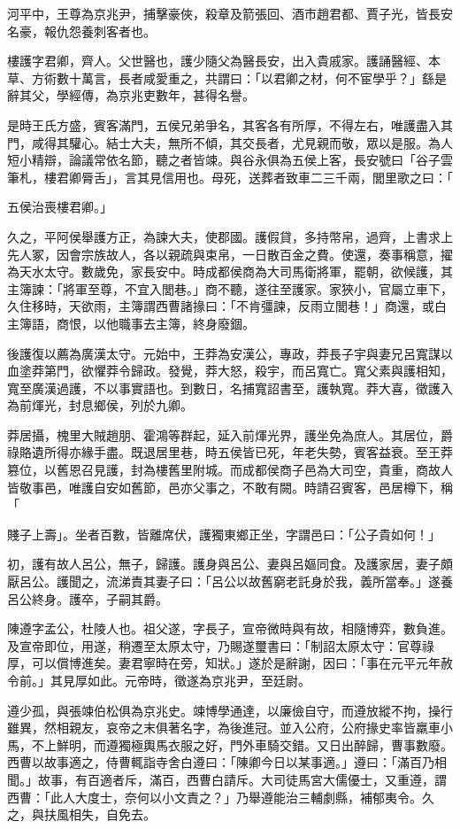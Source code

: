 \begin{pinyinscope}
河平中，王尊為京兆尹，捕擊豪俠，殺章及箭張回、酒市趙君都、賈子光，皆長安名豪，報仇怨養刺客者也。

樓護字君卿，齊人。父世醫也，護少隨父為醫長安，出入貴戚家。護誦醫經、本草、方術數十萬言，長者咸愛重之，共謂曰：「以君卿之材，何不宦學乎？」繇是辭其父，學經傳，為京兆吏數年，甚得名譽。

是時王氏方盛，賓客滿門，五侯兄弟爭名，其客各有所厚，不得左右，唯護盡入其門，咸得其驩心。結士大夫，無所不傾，其交長者，尤見親而敬，眾以是服。為人短小精辯，論議常依名節，聽之者皆竦。與谷永俱為五侯上客，長安號曰「谷子雲筆札，樓君卿脣舌」，言其見信用也。母死，送葬者致車二三千兩，閭里歌之曰：「

五侯治喪樓君卿。」

久之，平阿侯舉護方正，為諫大夫，使郡國。護假貸，多持幣帛，過齊，上書求上先人冢，因會宗族故人，各以親疏與束帛，一日散百金之費。使還，奏事稱意，擢為天水太守。數歲免，家長安中。時成都侯商為大司馬衛將軍，罷朝，欲候護，其主簿諫：「將軍至尊，不宜入閭巷。」商不聽，遂往至護家。家狹小，官屬立車下，久住移時，天欲雨，主簿謂西曹諸掾曰：「不肯彊諫，反雨立閭巷！」商還，或白主簿語，商恨，以他職事去主簿，終身廢錮。

後護復以薦為廣漢太守。元始中，王莽為安漢公，專政，莽長子宇與妻兄呂寬謀以血塗莽第門，欲懼莽令歸政。發覺，莽大怒，殺宇，而呂寬亡。寬父素與護相知，寬至廣漢過護，不以事實語也。到數日，名捕寬詔書至，護執寬。莽大喜，徵護入為前煇光，封息鄉侯，列於九卿。

莽居攝，槐里大賊趙朋、霍鴻等群起，延入前煇光界，護坐免為庶人。其居位，爵祿賂遺所得亦緣手盡。既退居里巷，時五侯皆已死，年老失勢，賓客益衰。至王莽篡位，以舊恩召見護，封為樓舊里附城。而成都侯商子邑為大司空，貴重，商故人皆敬事邑，唯護自安如舊節，邑亦父事之，不敢有闕。時請召賓客，邑居樽下，稱「

賤子上壽」。坐者百數，皆離席伏，護獨東鄉正坐，字謂邑曰：「公子貴如何！」

初，護有故人呂公，無子，歸護。護身與呂公、妻與呂嫗同食。及護家居，妻子頗厭呂公。護聞之，流涕責其妻子曰：「呂公以故舊窮老託身於我，義所當奉。」遂養呂公終身。護卒，子嗣其爵。

陳遵字孟公，杜陵人也。祖父遂，字長子，宣帝微時與有故，相隨博弈，數負進。及宣帝即位，用遂，稍遷至太原太守，乃賜遂璽書曰：「制詔太原太守：官尊祿厚，可以償博進矣。妻君寧時在旁，知狀。」遂於是辭謝，因曰：「事在元平元年赦令前。」其見厚如此。元帝時，徵遂為京兆尹，至廷尉。

遵少孤，與張竦伯松俱為京兆史。竦博學通達，以廉儉自守，而遵放縱不拘，操行雖異，然相親友，哀帝之末俱著名字，為後進冠。並入公府，公府掾史率皆羸車小馬，不上鮮明，而遵獨極輿馬衣服之好，門外車騎交錯。又日出醉歸，曹事數廢。西曹以故事適之，侍曹輒詣寺舍白遵曰：「陳卿今日以某事適。」遵曰：「滿百乃相聞。」故事，有百適者斥，滿百，西曹白請斥。大司徒馬宮大儒優士，又重遵，謂西曹：「此人大度士，奈何以小文責之？」乃舉遵能治三輔劇縣，補郁夷令。久之，與扶風相失，自免去。


\end{pinyinscope}
